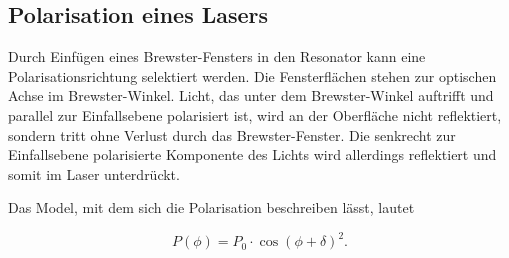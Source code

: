 

\subsection{Polarisation eines Lasers}
Durch Einfügen eines Brewster-Fensters in den Resonator kann eine Polarisationsrichtung selektiert werden.
Die Fensterflächen stehen  zur optischen Achse im Brewster-Winkel. Licht, das unter dem Brewster-Winkel auftrifft und parallel zur Einfallsebene polarisiert ist, wird an der Oberfläche nicht reflektiert, sondern tritt ohne Verlust durch das Brewster-Fenster. Die senkrecht zur Einfallsebene polarisierte Komponente des Lichts wird allerdings reflektiert und somit im Laser unterdrückt.

Das Model, mit dem sich die Polarisation beschreiben lässt, lautet 

\begin{equation}
    P(\phi) = P_0 \cdot \cos\left( \phi + \delta \right)^2. 
    \label{eq:polar}
\end{equation}
